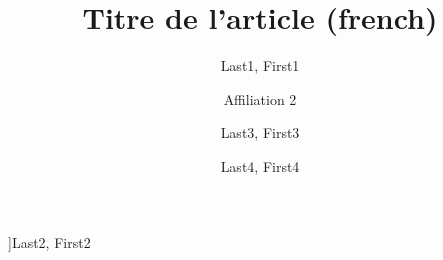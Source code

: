 \documentclass[french]{nwejmart}
\begin{document}
\nocite{*}
%
\title{Titre de l'article (french)}
\author[affiliation={Affiliation 1}]{Last1, First1}
\author[affiliation=[aff2]{Affiliation 2}]{Last2, First2}
\author[affiliation={Affiliation 3},affiliation={Affiliation 3 bis}]{Last3, First3}
\author[affiliation={Affiliation 4},affiliationtagged={aff2}]{Last4, First4}
%
\end{document}
